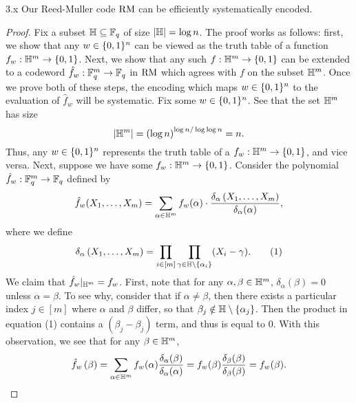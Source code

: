 \documentclass[11pt]{article}
\begin{document}
\begin{claim}{3.x}
    Our Reed-Muller code $\mathrm{RM}$ can be efficiently systematically encoded.
\end{claim}

\begin{proof}
    Fix a subset $\mathbb{H} \subseteq \mathbb{F}_q$ of size $|\mathbb{H}| = \log n$. The proof works as follows: first, we show that any $w \in \{0, 1\}^n$ can be viewed as the truth table of a function $f_w : \mathbb{H}^m \rightarrow \{0, 1\}$. Next, we show that any such $f : \mathbb{H}^m \rightarrow \{0, 1\}$ can be extended to a codeword $\hat{f}_w : \mathbb{F}_q^m \rightarrow \mathbb{F}_q$ in $\mathrm{RM}$ which agrees with $f$ on the subset $\mathbb{H}^m$. Once we prove both of these steps, the encoding which maps $w \in \{0, 1\}^n$ to the evaluation of $\hat{f}_w$ will be systematic. Fix some $w \in \{0, 1\}^n$. See that the set $\mathbb{H}^m$ has size 
    \begin{equation*}
        |\mathbb{H}^m| = \left(\log n\right)^{\log n / \log \log n} = n.
    \end{equation*}
    Thus, any $w \in \{0, 1\}^n$ represents the truth table of a $f_w : \mathbb{H}^m \rightarrow \{0, 1\}$, and vice versa. Next, suppose we have some $f_w : \mathbb{H}^m \rightarrow \{0, 1\}$. Consider the polynomial $\hat{f}_w : \mathbb{F}_q^m \rightarrow \mathbb{F}_q$ defined by 
    \begin{equation*}
        \hat{f}_w(X_1, \ldots, X_m) = \sum_{\alpha \in \mathbb{H}^m} f_w(\alpha) \cdot \frac{\delta_\alpha \left(X_1, \ldots, X_m\right)}{\delta_\alpha(\alpha)},
    \end{equation*}
    where we define 
    \begin{equation*}
        \delta_\alpha \left(X_1, \ldots, X_m\right) = \prod_{i \in [m]} \prod_{\gamma \in \mathbb{H} \setminus \{\alpha_i\}} (X_i - \gamma). \tag{1}
    \end{equation*}
    We claim that $\hat{f}_w |_{\mathbb{H}^m} = f_w$. First, note that for any $\alpha, \beta \in \mathbb{H}^m$, $\delta_{\alpha}(\beta) = 0$ unless $\alpha = \beta$. To see why, consider that if $\alpha \neq \beta$, then there exists a particular index $j \in [m]$ where $\alpha$ and $\beta$ differ, so that $\beta_j \notin \mathbb{H} \setminus \{\alpha_j\}$. Then the product in equation (1) contains a $(\beta_j - \beta_j)$ term, and thus is equal to $0$. With this observation, we see that for any $\beta \in \mathbb{H}^m$, 
    \begin{equation*}
        \hat{f}_w \left(\beta\right) = \sum_{\alpha \in \bH^m} f_w(\alpha) \frac{\delta_\alpha(\beta)}{\delta_{\alpha}(\alpha)} = f_w(\beta) \frac{\delta_\beta(\beta)}{\delta_\beta(\beta)} = f_w(\beta).

\end{equation*}
\end{proof}
\end{document}
